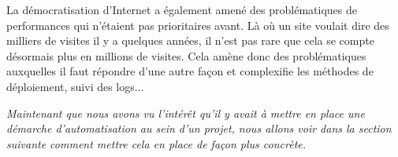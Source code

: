 La démocratisation d'Internet a également amené des problématiques de performances qui n'étaient pas prioritaires avant. Là où un site  voulait dire des milliers de visites il y a quelques années, il n'est pas rare que cela se compte désormais plus en millions de visites. Cela amène donc des problématiques auxquelles il faut répondre d'une autre façon et complexifie les méthodes de déploiement, suivi des logs...

\hrulefill

\emph{Maintenant que nous avons vu l'intérêt qu'il y avait à mettre en place une démarche d'automatisation au sein d'un projet, nous allons voir dans la section suivante comment mettre cela en place de façon plus concrète.}